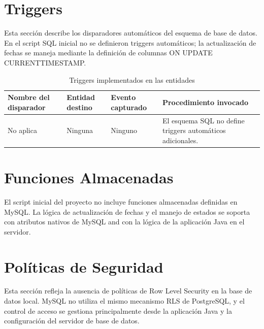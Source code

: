 \documentclass[12pt,letterpaper]{article}
\providecommand{\toprule}{}
\providecommand{\midrule}{}
\renewcommand{\toprule}{\hline}
\renewcommand{\midrule}{\hline}
\newcommand{\code}[1]{\texorpdfstring{\begingroup\normalfont\normalsize\def\_{\textunderscore\allowbreak}#1\endgroup}{#1}}
\begin{document}
\section{Triggers}

Esta sección describe los disparadores automáticos del esquema de base de datos. En el script SQL inicial no se definieron triggers automáticos; la actualización de fechas se maneja mediante la definición de columnas \code{ON UPDATE CURRENT\_TIMESTAMP}.

\begin{longtable}{|L{0.30\textwidth}|L{0.16\textwidth}|L{0.18\textwidth}|L{0.26\textwidth}|}
\caption{Triggers implementados en las entidades}\\
\toprule
\textbf{Nombre del disparador} & \textbf{Entidad destino} & \textbf{Evento capturado} & \textbf{Procedimiento invocado} \\
\midrule
No aplica & Ninguna & Ninguno & El esquema SQL no define triggers automáticos adicionales. \\
\end{longtable}

\section{Funciones Almacenadas}

El script inicial del proyecto no incluye funciones almacenadas definidas en MySQL. La lógica de actualización de fechas y el manejo de estados se soporta con atributos nativos de MySQL and con la lógica de la aplicación Java en el servidor.

\section{Políticas de Seguridad}

Esta sección refleja la ausencia de políticas de Row Level Security en la base de datos local. MySQL no utiliza el mismo mecanismo RLS de PostgreSQL, y el control de acceso se gestiona principalmente desde la aplicación Java y la configuración del servidor de base de datos.
\end{document}
